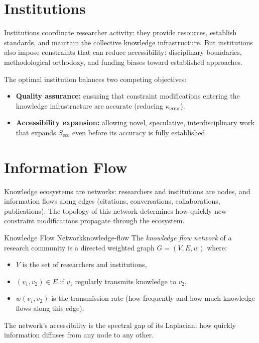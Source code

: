 \section{Institutions}

Institutions coordinate researcher activity: they provide resources,
establish standards, and maintain the collective knowledge infrastructure.
But institutions also impose constraints that can reduce accessibility:
disciplinary boundaries, methodological orthodoxy, and funding biases
toward established approaches.

The optimal institution balances two competing objectives:
\begin{itemize}
  \item \textbf{Quality assurance:} ensuring that constraint modifications
        entering the knowledge infrastructure are accurate
        (reducing $\kappa_\text{error}$).
  \item \textbf{Accessibility expansion:} allowing novel, speculative,
        interdisciplinary work that expands $S_\text{eco}$
        even before its accuracy is fully established.
\end{itemize}

\section{Information Flow}

Knowledge ecosystems are networks: researchers and institutions are nodes,
and information flows along edges (citations, conversations, collaborations,
publications). The topology of this network determines how quickly new
constraint modifications propagate through the ecosystem.

\begin{definition}{Knowledge Flow Network}{knowledge-flow}
  The \emph{knowledge flow network} of a research community is a
  directed weighted graph $G = (V, E, w)$ where:
  \begin{itemize}
    \item $V$ is the set of researchers and institutions,
    \item $(v_1, v_2) \in E$ if $v_1$ regularly transmits knowledge
          to $v_2$,
    \item $w(v_1, v_2)$ is the transmission rate (how frequently and
          how much knowledge flows along this edge).
  \end{itemize}
  The network's accessibility is the spectral gap of its Laplacian:
  how quickly information diffuses from any node to any other.
\end{definition}

